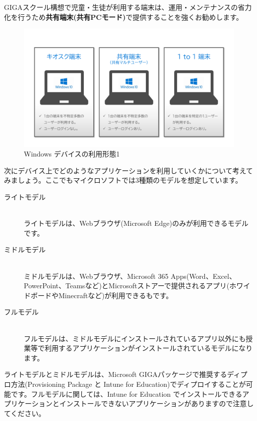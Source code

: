 GIGAスクール構想で児童・生徒が利用する端末は、運用・メンテナンスの省力化を行うため\textbf{共有端末(共有PCモード)}で提供することを強くお勧めします。


\begin{figure}[htbp]
    \centering
    \includegraphics[width=12cm]{figures/HowtoUsePC-1.png}
    \caption{Windows デバイスの利用形態1}
    \label{fig:Windowデバイスの利用形態1}
\end{figure}

次にデバイス上でどのようなアプリケーションを利用していくかについて考えてみましょう。ここでもマイクロソフトでは3種類のモデルを想定しています。

\begin{description}
    \item[ライトモデル]\mbox{}\\
    ライトモデルは、Webブラウザ(Microsoft Edge)のみが利用できるモデルです。
    \item[ミドルモデル]\mbox{}\\
    ミドルモデルは、Webブラウザ、Microsoft 365 Apps(Word、Excel、PowerPoint、Teamsなど)とMicrosoftストアーで提供されるアプリ(ホワイドボードやMinecraftなど)が利用できるもです。
    \item[フルモデル]\mbox{}\\
    フルモデルは、ミドルモデルにインストールされているアプリ以外にも授業等で利用するアプリケーションがインストールされているモデルになります。
\end{description}

ライトモデルとミドルモデルは、Microsoft GIGAパッケージで推奨するディプロ方法(Provisioning Package と Intune for Education)でディプロイすることが可能です。フルモデルに関しては、Intune for Education でインストールできるアプリケーションとインストールできないアプリケーションがありますので注意してください。

